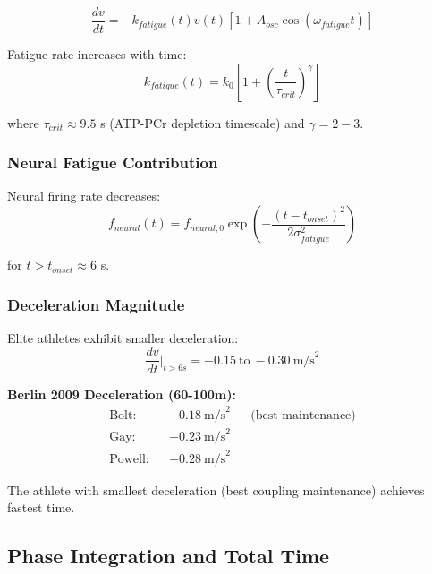 \begin{equation}
\frac{dv}{dt} = -k_{fatigue}(t) v(t) \left[1 + A_{osc} \cos(\omega_{fatigue} t)\right]
\label{eq:deceleration_dynamics}
\end{equation}

Fatigue rate increases with time:
\begin{equation}
k_{fatigue}(t) = k_0 \left[1 + \left(\frac{t}{\tau_{crit}}\right)^{\gamma}\right]
\label{eq:fatigue_rate}
\end{equation}

where $\tau_{crit} \approx 9.5$ s (ATP-PCr depletion timescale) and $\gamma = 2-3$.

\subsubsection{Neural Fatigue Contribution}

Neural firing rate decreases:
\begin{equation}
f_{neural}(t) = f_{neural,0} \exp\left(-\frac{(t - t_{onset})^2}{2\sigma_{fatigue}^2}\right)
\label{eq:neural_fatigue}
\end{equation}

for $t > t_{onset} \approx 6$ s.

\subsubsection{Deceleration Magnitude}

Elite athletes exhibit smaller deceleration:
\begin{equation}
\frac{dv}{dt}\bigg|_{t>6s} = -0.15~\text{to}~-0.30~\text{m/s}^2
\label{eq:deceleration_rate}
\end{equation}

\textbf{Berlin 2009 Deceleration (60-100m):}
\begin{align}
\text{Bolt:} && -0.18~\text{m/s}^2 && \text{(best maintenance)} \\
\text{Gay:} && -0.23~\text{m/s}^2 \\
\text{Powell:} && -0.28~\text{m/s}^2
\end{align}

The athlete with smallest deceleration (best coupling maintenance) achieves fastest time.

\subsection{Phase Integration and Total Time}

